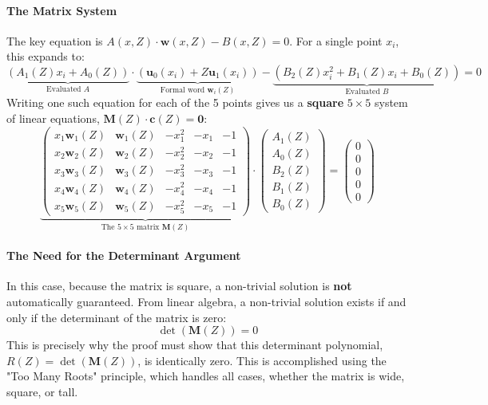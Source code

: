 \documentclass{article}
\begin{document}
\begin{tcolorbox}[breakable, title={Example: The General Case (A "Tall" or Square Matrix)}]
\paragraph{The Matrix System}
The key equation is $A(x,Z) \cdot \mathbf{w}(x,Z) - B(x,Z) = 0$. For a single point $x_i$, this expands to:
\[ \underbrace{\left( A_1(Z)x_i + A_0(Z) \right)}_{\text{Evaluated } A} \cdot \underbrace{\left( \mathbf{u}_0(x_i) + Z\mathbf{u}_1(x_i) \right)}_{\text{Formal word } \mathbf{w}_i(Z)} - \underbrace{\left( B_2(Z)x_i^2 + B_1(Z)x_i + B_0(Z) \right)}_{\text{Evaluated } B} = 0 \]
Writing one such equation for each of the 5 points gives us a \textbf{square} $5 \times 5$ system of linear equations, $\mathbf{M}(Z) \cdot \mathbf{c}(Z) = \mathbf{0}$:
\[
\underbrace{
\begin{pmatrix}
x_1 \mathbf{w}_1(Z) & \mathbf{w}_1(Z) & -x_1^2 & -x_1 & -1 \\
x_2 \mathbf{w}_2(Z) & \mathbf{w}_2(Z) & -x_2^2 & -x_2 & -1 \\
x_3 \mathbf{w}_3(Z) & \mathbf{w}_3(Z) & -x_3^2 & -x_3 & -1 \\
x_4 \mathbf{w}_4(Z) & \mathbf{w}_4(Z) & -x_4^2 & -x_4 & -1 \\
x_5 \mathbf{w}_5(Z) & \mathbf{w}_5(Z) & -x_5^2 & -x_5 & -1
\end{pmatrix}
}_{\text{The } 5 \times 5 \text{ matrix } \mathbf{M}(Z)}
\cdot
\begin{pmatrix}
A_1(Z) \\ A_0(Z) \\ B_2(Z) \\ B_1(Z) \\ B_0(Z)
\end{pmatrix}
=
\begin{pmatrix}
0 \\ 0 \\ 0 \\ 0 \\ 0
\end{pmatrix}
\]

\paragraph{The Need for the Determinant Argument}
In this case, because the matrix is square, a non-trivial solution is \textbf{not} automatically guaranteed. From linear algebra, a non-trivial solution exists if and only if the determinant of the matrix is zero:
\[ \det(\mathbf{M}(Z)) = 0 \]
This is precisely why the proof must show that this determinant polynomial, $R(Z) = \det(\mathbf{M}(Z))$, is identically zero. This is accomplished using the "Too Many Roots" principle, which handles all cases, whether the matrix is wide, square, or tall.
\end{tcolorbox}
\end{document}
